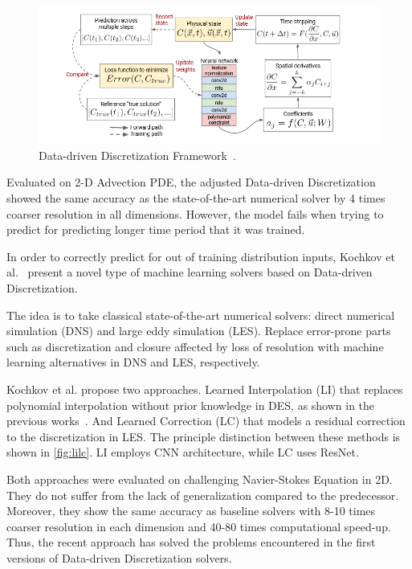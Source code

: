 \begin{figure}
	\centering
	\includegraphics[width=12cm]{figures/ddd.png}
	\caption{Data-driven Discretization Framework~\cite{Brenner20}.}
	\label{fig:ddd}
\end{figure}  

Evaluated on 2-D Advection PDE, the adjusted Data-driven Discretization showed the same accuracy as the state-of-the-art numerical solver by 4 times coarser resolution in all dimensions. However, the model fails when trying to predict for predicting longer time period that it was trained. 

In order to correctly predict for out of training distribution inputs, Kochkov et al.~\cite{Brenner21} present a novel type of machine learning solvers based on Data-driven Discretization. 

The idea is to take classical state-of-the-art numerical solvers: direct numerical simulation (DNS) and large eddy simulation (LES). Replace error-prone parts such as discretization and closure affected by loss of resolution with machine learning alternatives in DNS and LES, respectively. 

Kochkov et al. propose two approaches. Learned Interpolation (LI) that replaces polynomial interpolation without prior knowledge in DES, as shown in the previous works~\cite{Brenner19, Brenner20}. And Learned Correction (LC) that models a residual correction to the discretization in LES. The principle distinction between these methods is shown in \cref{fig:lilc}. LI employs CNN architecture, while LC uses ResNet. 

Both approaches were evaluated on challenging Navier-Stokes Equation in 2D. They do not suffer from the lack of generalization compared to the predecessor. Moreover, they show the same accuracy as baseline solvers with 8-10 times coarser resolution in each dimension and 40-80 times computational speed-up. Thus, the recent approach has solved the problems encountered in the first versions of Data-driven Discretization solvers.

